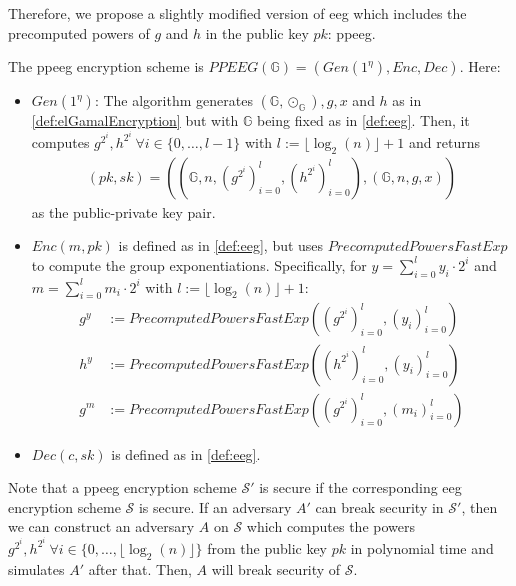 Therefore, we propose a slightly modified version of \gls{eeg} which includes the precomputed powers of $g$ and $h$ in the public key $pk$: \gls{ppeeg}.

\newpage
\begin{definition}
    \label{def:ppeeg}
    The \gls{ppeeg} encryption scheme is $PPEEG(\mathbb{G})=(Gen(1^\eta), Enc, Dec)$. 
    Here:
    \begin{itemize}
        \item $Gen(1^\eta)$: The algorithm generates $(\mathbb{G}, \odot_{\mathbb{G}}), g, x$ and $h$ as in \cref{def:elGamalEncryption} but with $\mathbb{G}$ being fixed as in \cref{def:eeg}.
        Then, it computes $g^{2^i}, h^{2^i}\:\forall i\in\{0,\dots, l-1\}$ with $l:=\lfloor\log_2(n)\rfloor+1$ and returns 
        \begin{align*}
            (pk, sk)=\left(\left(\mathbb{G}, n, \left(g^{2^i}\right)_{i=0}^{l}, \left(h^{2^i}\right)_{i=0}^{l}\right), (\mathbb{G}, n, g, x)\right) 
        \end{align*}
        as the public-private key pair.
        \item $Enc(m, pk)$ is defined as in \cref{def:eeg}, but uses $PrecomputedPowersFastExp$ to compute the group exponentiations. 
        Specifically, for $y=\sum\limits_{i=0}^{l}y_i\cdot 2^i$ and $m=\sum\limits_{i=0}^{l}m_i\cdot 2^i$ with $l:=\lfloor\log_2(n)\rfloor+1$:
        \begin{align*}
            g^{y}&:= PrecomputedPowersFastExp\left(\left(g^{2^i}\right)_{i=0}^{l}, \left(y_i\right)_{i=0}^{l}\right)\\
            h^{y}&:= PrecomputedPowersFastExp\left(\left(h^{2^i}\right)_{i=0}^{l}, \left(y_i\right)_{i=0}^{l}\right)\\
            g^{m}&:= PrecomputedPowersFastExp\left(\left(g^{2^i}\right)_{i=0}^{l}, \left(m_i\right)_{i=0}^{l}\right)
        \end{align*}
        \item $Dec(c, sk)$ is defined as in \cref{def:eeg}.
    \end{itemize}
\end{definition}

Note that a \gls{ppeeg} encryption scheme $\mathcal{S}'$ is secure if the corresponding \gls{eeg} encryption scheme $\mathcal{S}$ is secure.
If an adversary $A'$ can break security in $\mathcal{S}'$, then we can construct an adversary $A$ on $\mathcal{S}$ which computes the powers $g^{2^i}, h^{2^i}\:\forall i\in\{0,\dots, \lfloor\log_2(n)\rfloor\}$ from the public key $pk$ in polynomial time and simulates $A'$ after that.
Then, $A$ will break security of $\mathcal{S}$.

